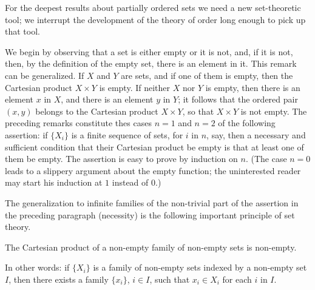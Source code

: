 
For the deepest results about partially ordered sets we need a new set-theoretic tool; we interrupt the development of the theory of order long enough to pick up that tool. 

We begin by observing that a set is either empty or it is not, and, if it is not, then, by the definition of the empty set, there is an element in it. This remark can be generalized. If $X$ and $Y$ are sets, and if one of them is empty, then the Cartesian product $X \times Y$ is empty. If neither $X$ nor $Y$ is empty, then there is an element $x$ in $X$, and there is an element $y$ in $Y$; it follows that the ordered pair $(x, y)$ belongs to the Cartesian product $X \times Y$, so that $X \times Y$ is not empty. The preceding remarks constitute thes cases $n = 1$ and $n = 2$ of the following assertion: if $\{ X_{i} \}$ is a finite sequence of sets, for $i$ in $n$, say, then a necessary and sufficient condition that their Cartesian product be empty is that at least one of them be empty. The assertion is easy to prove by induction on $n$. (The case $n = 0$ leads to a slippery argument about the empty function; the uninterested reader may start his induction at $1$ instead of $0$.) 

The generalization to infinite families of the non-trivial part of the assertion in the preceding paragraph (necessity) is the following important principle of set theory. 

\begin{named} The Cartesian product of a non-empty family of non-empty sets is non-empty. 
\end{named}

In other words: if $\{ X_{i} \}$ is a family of non-empty sets indexed by a non-empty set $I$, then there exists a family $\{ x_{i} \}$, $i \in I$, such that $x_{i} \in X_{i}$ for each $i$ in $I$. 

